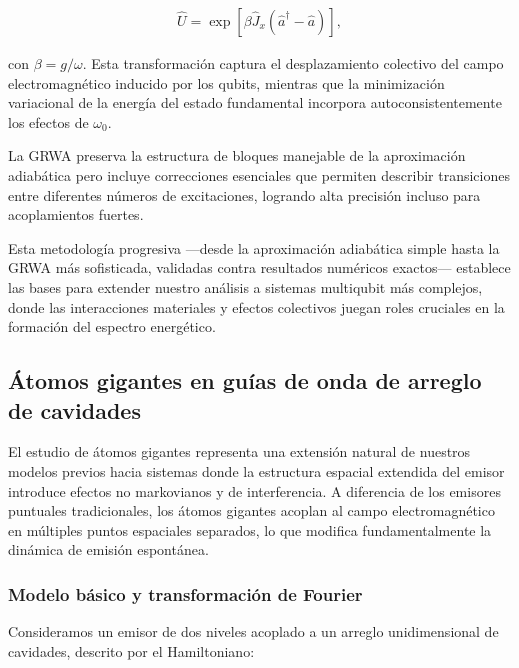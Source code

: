 \documentclass[onecolumn,notitlepage,letterpaper,aps,pra,12pt]{article}
\numberwithin{equation}{section}
\begin{document}
\begin{gather}\label{transformation beta}
    \hat{U} = \exp\left[ \beta\hat{J}_{x}(\hat{a}^{\dagger} - \hat{a}) \right],
\end{gather}

con $\beta=g/\omega$. Esta transformación captura el desplazamiento colectivo del campo electromagnético inducido por los qubits, mientras que la minimización variacional de la energía del estado fundamental incorpora autoconsistentemente los efectos de $\omega_0$.

La GRWA preserva la estructura de bloques manejable de la aproximación adiabática pero incluye correcciones esenciales que permiten describir transiciones entre diferentes números de excitaciones, logrando alta precisión incluso para acoplamientos fuertes.

Esta metodología progresiva —desde la aproximación adiabática simple hasta la GRWA más sofisticada, validadas contra resultados numéricos exactos— establece las bases para extender nuestro análisis a sistemas multiqubit más complejos, donde las interacciones materiales y efectos colectivos juegan roles cruciales en la formación del espectro energético.
 

\clearpage

\subsection{Átomos gigantes en guías de onda de arreglo de cavidades}

El estudio de átomos gigantes representa una extensión natural de nuestros modelos previos hacia sistemas donde la estructura espacial extendida del emisor introduce efectos no markovianos y de interferencia. A diferencia de los emisores puntuales tradicionales, los átomos gigantes acoplan al campo electromagnético en múltiples puntos espaciales separados, lo que modifica fundamentalmente la dinámica de emisión espontánea.

\subsubsection{Modelo básico y transformación de Fourier}

Consideramos un emisor de dos niveles acoplado a un arreglo unidimensional de cavidades, descrito por el Hamiltoniano:
\end{document}
